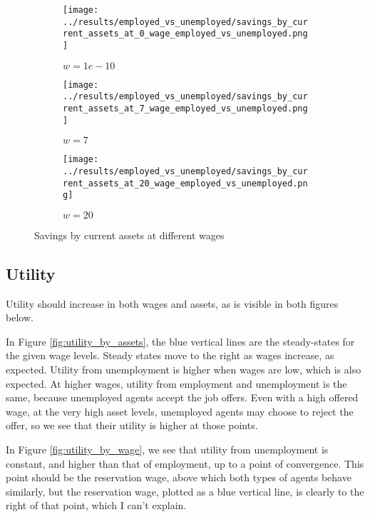 \documentclass[12pt]{article}
\begin{document}
\begin{figure}[hbt!]

\begin{subfigure}{0.33\textwidth}
\texttt{[image: ../results/employed\_vs\_unemployed/savings\_by\_current\_assets\_at\_0\_wage\_employed\_vs\_unemployed.png]} \caption{$w=1e-10$}
\end{subfigure}%
\begin{subfigure}{0.33\textwidth}
\texttt{[image: ../results/employed\_vs\_unemployed/savings\_by\_current\_assets\_at\_7\_wage\_employed\_vs\_unemployed.png]}
\caption{$w=7$}
\end{subfigure}%
\begin{subfigure}{0.33\textwidth}
\texttt{[image: ../results/employed\_vs\_unemployed/savings\_by\_current\_assets\_at\_20\_wage\_employed\_vs\_unemployed.png]}
\caption{$w=20$}
\end{subfigure}

\caption{Savings by current assets at different wages}
\label{fig:savings_by_current_assets}
\end{figure}

\clearpage

\subsection{Utility}

Utility should increase in both wages and assets, as is visible in both figures below.

\vspace{5mm}
In Figure \ref{fig:utility_by_assets}, the blue vertical lines are the steady-states for the given wage levels. Steady states move to the right as wages increase, as expected. Utility from unemployment is higher when wages are low, which is also expected. At higher wages, utility from employment and unemployment is the same, because unemployed agents accept the job offers. Even with a high offered wage, at the very high asset levels, unemployed agents may choose to reject the offer, so we see that their utility is higher at those points.

\vspace{5mm}
In Figure \ref{fig:utility_by_wage}, we see that utility from unemployment is constant, and higher than that of employment, up to a point of convergence. This point should be the reservation wage, above which both types of agents behave similarly, but the reservation wage, plotted as a blue vertical line, is clearly to the right of that point, which I can't explain.
\end{document}

